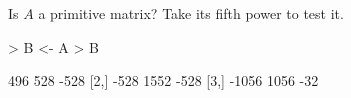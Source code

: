 \documentclass{article}
\begin{document}
Is $A$ a primitive matrix?  Take its fifth power to test it.

\begin{Schunk}
\begin{Sinput}
> B <- A%^%5
> B
\end{Sinput}
\begin{Soutput}
      [,1] [,2] [,3]
[1,]   496  528 -528
[2,]  -528 1552 -528
[3,] -1056 1056  -32
\end{Soutput}
\end{Schunk}
\end{document}
